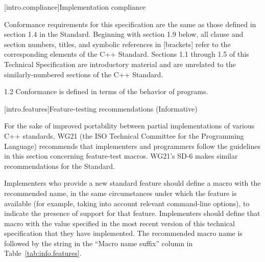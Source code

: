 
%
%
%

[intro.compliance]{Implementation compliance}

\pnum
Conformance requirements for this specification are the same as those 
defined in section 1.4 in the \Cpp Standard. Beginning with section 1.9 below, all clause and section numbers, titles,
and symbolic references in [brackets] refer to the corresponding elements of the C++ Standard. Sections 1.1 through 1.5 of this Technical
Specification are introductory material and are unrelated to the similarly-numbered sections of the C++ Standard.


1.2
\enternote 
Conformance is defined in terms of the behavior of programs.
\exitnote

[intro.features]{Feature-testing recommendations (Informative)}

\pnum
For the sake of improved portability between partial implementations of various
C++ standards, WG21 (the ISO Technical Committee for the \Cpp Programming
Language) recommends that implementers and programmers follow the guidelines in
this section concerning feature-test macros. 
\enternote 
WG21's SD-6 makes similar recommendations for the \Cpp Standard.
\exitnote

\pnum
Implementers who provide a new standard feature should define a macro with the
recommended name, in the same circumstances under which the feature is available
(for example, taking into account relevant command-line options), to indicate
the presence of support for that feature. Implementers should define that macro
with the value specified in the most recent version of this technical
specification that they have implemented. The recommended macro name is
 followed by the string in the ``Macro name suffix''
column in Table~\ref{tab:info.features}.

